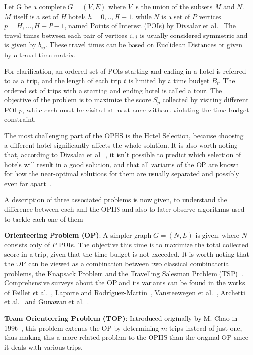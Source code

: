Let G be a complete $G=(V,E)$ where $V$ is the union of the subsets $M$ and $N$. $M$ itself is a set of $H$ hotels $h=0,..,H-1$, while $N$ is a set of $P$ vertices $p=H,...,H+P-1$, named Points of Interest (POIs) by Divsalar et al.~\cite{divsalar2014} The travel times between each pair of vertices $i,j$ is usually considered symmetric and is given by $b_{ij}$. These travel times can be based on Euclidean Distances or given by a travel time matrix.

For clarification, an ordered set of POIs starting and ending in a hotel is referred to as a trip, and the length of each trip $t$ is limited by a time budget $B_t$. The ordered set of trips with a starting and ending hotel is called a tour. The objective of the problem is to maximize the score $S_p$ collected by visiting different POI $p$, while each must be visited at most once without violating the time budget constraint.

The most challenging part of the OPHS is the Hotel Selection, because choosing a different hotel significantly affects the whole solution. It is also worth noting that, according to Divsalar et al.~\cite{divsalar2014}, it isn't possible to predict which selection of hotels will result in a good solution, and that all variants of the OP are known for how the near-optimal solutions for them are usually separated and possibly even far apart~\cite{divsalar2013}.

A description of three associated problems is now given, to understand the difference between each and the OPHS and also to later observe algorithms used to tackle each one of them:

\textbf{Orienteering Problem (OP)}: A simpler graph $G=(N,E)$ is given, where $N$ consists only of $P$ POIs. The objective this time is to maximize the total collected score in a trip, given that the time budget is not exceeded. It is worth noting that the OP can be viewed as a combination between two classical combinatorial problems, the Knapsack Problem and the Travelling Salesman Problem (TSP)~\cite{vansteenwegen2011}. Comprehensive surveys about the OP and its variants can be found in the works of Feillet et al.~\cite{feillet2005}, Laporte and Rodr\'iguez-Mart\'in~\cite{laporte2007}, Vansteewegen et al.~\cite{vansteenwegen2011}, Archetti et al.~\cite{archetti2014} and Gunawan et al.~\cite{gunawan2016}.

\textbf{Team Orienteering Problem (TOP)}: Introduced originally by M. Chao in 1996~\cite{chao1996}, this problem extends the OP by determining $m$ trips instead of just one, thus making this a more related problem to the OPHS than the original OP since it deals with various trips.

